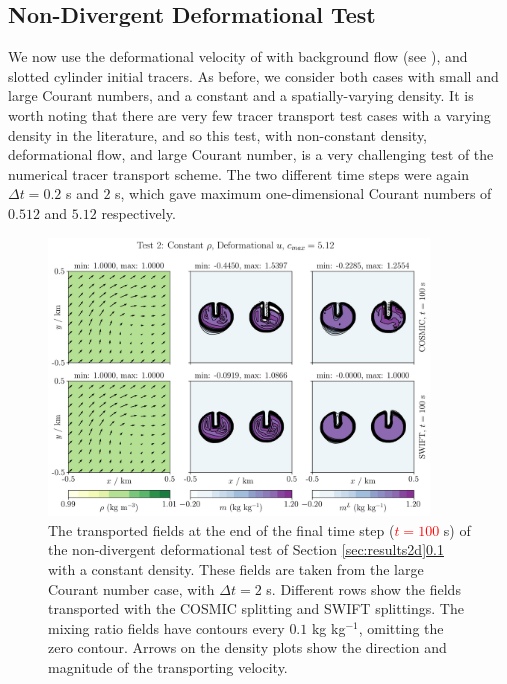 \documentclass{ametsocV6.1}
\newcommand{\change}[1]{\textcolor{red}{#1}}
\begin{document}
\subsection{Non-Divergent Deformational Test} \label{sec:test2}
We now use the deformational velocity of \cite{skamarock2006limiters} with background flow (see \citet{kent2020positive}), and slotted cylinder initial tracers. As before, we consider both cases with small and large Courant numbers, and a constant and a spatially-varying density. It is worth noting that there are very few tracer transport test cases with a varying density in the literature, and so this test, with non-constant density, deformational flow, and large Courant number, is a very challenging test of the numerical tracer transport scheme. 
The two different time steps were again $\Delta t=0.2$ s and $2$ s, which gave maximum one-dimensional Courant numbers of $0.512$ and $5.12$ respectively. \\
\begin{figure}[ht!]
\centering
\includegraphics[width=0.9\textwidth]{fig_3_deformational.jpg}
\caption{The transported fields at the end of the final time step (\change{$t=100$} s) of the non-divergent deformational test of Section \ref{sec:results2d}\ref{sec:test2} with a constant density. These fields are taken from the large Courant number case, with $\Delta t=2$ s. Different rows show the fields transported with the COSMIC splitting and SWIFT splittings.
The mixing ratio fields have contours every $0.1$ kg kg$^{-1}$, omitting the zero contour.
Arrows on the density plots show the direction and magnitude of the transporting velocity.}\label{fig:test2constrho}
\end{figure} \\
\end{document}
